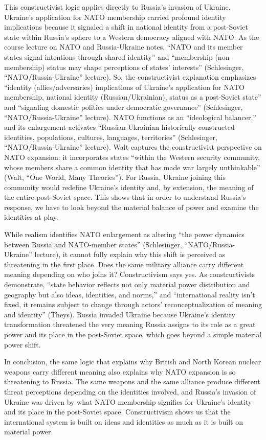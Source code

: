 \documentclass[12pt]{article}
\begin{document}
This constructivist logic applies directly to Russia's invasion of Ukraine. Ukraine's application for NATO membership carried profound identity implications because it signaled a shift in national identity from a post-Soviet state within Russia's sphere to a Western democracy aligned with NATO. As the course lecture on NATO and Russia-Ukraine notes, ``NATO and its member states signal intentions through shared identity'' and ``membership (non-membership) status may shape perceptions of states' interests'' (Schlesinger, ``NATO/Russia-Ukraine'' lecture). So, the constructivist explanation emphasizes ``identity (allies/adversaries) implications of Ukraine's application for NATO membership, national identity (Russian/Ukrainian), status as a post-Soviet state'' and ``signaling domestic politics under democratic governance'' (Schlesinger, ``NATO/Russia-Ukraine'' lecture). NATO functions as an ``ideological balancer,'' and its enlargement activates ``Russian-Ukrainian historically constructed identities, populations, cultures, languages, territories'' (Schlesinger, ``NATO/Russia-Ukraine'' lecture). Walt captures the constructivist perspective on NATO expansion: it incorporates states ``within the Western security community, whose members share a common identity that has made war largely unthinkable'' (Walt, ``One World, Many Theories''). For Russia, Ukraine joining this community would redefine Ukraine's identity and, by extension, the meaning of the entire post-Soviet space. This shows that in order to understand Russia's response, we have to look beyond the material balance of power and examine the identities at play.

While realism identifies NATO enlargement as altering ``the power dynamics between Russia and NATO-member states'' (Schlesinger, ``NATO/Russia-Ukraine'' lecture), it cannot fully explain why this shift is perceived as threatening in the first place. Does the same military alliance carry different meaning depending on who joins it? Constructivism says yes. As constructivists demonstrate, ``state behavior reflects not only material power distribution and geography but also ideas, identities, and norms,'' and ``international reality isn't fixed, it remains subject to change through actors' reconceptualization of meaning and identity'' (Theys). Russia invaded Ukraine because Ukraine's identity transformation threatened the very meaning Russia assigns to its role as a great power and its place in the post-Soviet space, which goes beyond a simple material power shift.

In conclusion, the same logic that explains why British and North Korean nuclear weapons carry different meaning also explains why NATO expansion is so threatening to Russia. The same weapons and the same alliance produce different threat perceptions depending on the identities involved, and Russia's invasion of Ukraine was driven by what NATO membership signifies for Ukraine's identity and its place in the post-Soviet space. Constructivism shows us that the international system is built on ideas and identities as much as it is built on material power.
\end{document}
